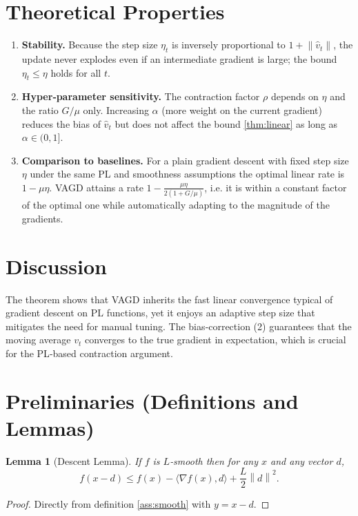 \documentclass{article}
\newtheorem{lemma}{Lemma}
\newcommand{\norm}[1]{\left\|#1\right\|}
\newcommand{\inner}[2]{\langle #1,#2\rangle}
\newcommand{\grad}{\nabla}
\begin{document}
\section*{Theoretical Properties}
\begin{enumerate}[label=\arabic*.]
\item \textbf{Stability.} Because the step size $\eta_{t}$ is inversely
proportional to $1+\norm{\hat v_{t}}$, the update never explodes even if an
intermediate gradient is large; the bound $\eta_{t}\le\eta$ holds for all $t$.
\item \textbf{Hyper‑parameter sensitivity.}
The contraction factor $\rho$ depends on $\eta$ and the ratio $G/\mu$ only.
Increasing $\alpha$ (more weight on the current gradient) reduces the bias of
$\hat v_{t}$ but does not affect the bound \eqref{thm:linear} as long as
$\alpha\in(0,1]$.
\item \textbf{Comparison to baselines.}
For a plain gradient descent with fixed step size $\eta$ under the same PL and
smoothness assumptions the optimal linear rate is $1-\mu\eta$.  VAGD attains a
rate $1-\frac{\mu\eta}{2(1+G/\mu)}$, i.e. it is within a constant factor of the
optimal one while automatically adapting to the magnitude of the gradients.
\end{enumerate}

\section*{Discussion}
The theorem shows that VAGD inherits the fast linear convergence typical of
gradient descent on PL functions, yet it enjoys an adaptive step size that
mitigates the need for manual tuning.  The bias‑correction (2) guarantees that
the moving average $v_{t}$ converges to the true gradient in expectation,
which is crucial for the PL‑based contraction argument.

\newpage

\section*{Preliminaries (Definitions and Lemmas)}
\begin{lemma}[Descent Lemma]\label{lem:descent}
If $f$ is $L$‑smooth then for any $x$ and any vector $d$,
\[
f(x-d)\le f(x)-\inner{\grad f(x)}{d}+\frac{L}{2}\norm{d}^{2}.
\tag{9}
\]
\end{lemma}
\begin{proof}
Directly from definition \ref{ass:smooth} with $y=x-d$.
\end{proof}
\end{document}
